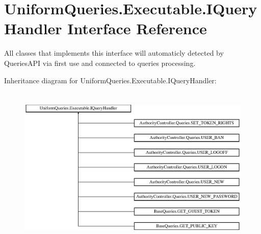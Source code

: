 \hypertarget{interface_uniform_queries_1_1_executable_1_1_i_query_handler}{}\section{Uniform\+Queries.\+Executable.\+I\+Query\+Handler Interface Reference}
\label{interface_uniform_queries_1_1_executable_1_1_i_query_handler}


All classes that implements this interface will automaticly detected by Queries\+A\+PI via first use and connected to queries processing.  


Inheritance diagram for Uniform\+Queries.\+Executable.\+I\+Query\+Handler\+:\begin{figure}[H]
\begin{center}
\leavevmode
\includegraphics[height=7.753846cm]{d2/d1b/interface_uniform_queries_1_1_executable_1_1_i_query_handler}
\end{center}
\end{figure}
